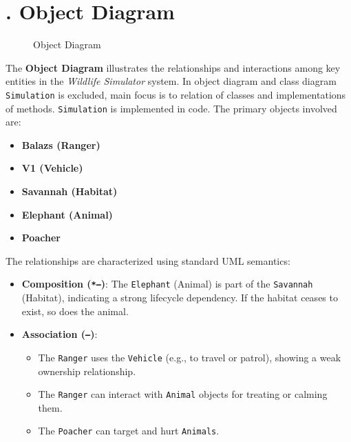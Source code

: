 \documentclass[a4paper,12pt]{article}
\begin{document}
\newpage


\section*{. Object Diagram}

\begin{figure}[H]
    \centering
    \caption{Object Diagram}
    \label{fig:object-diagram}
\end{figure}

\vspace{0.5em}

\noindent
The \textbf{Object Diagram} illustrates the relationships and interactions among key entities in the \emph{Wildlife Simulator} system. In object diagram and class diagram \texttt{Simulation} is excluded, main focus is to relation of classes and implementations of methods. \texttt{Simulation} is implemented in code. The primary objects involved are:

\begin{itemize}
    \item \textbf{Balazs (Ranger)}
    \item \textbf{V1 (Vehicle)}
    \item \textbf{Savannah (Habitat)}
    \item \textbf{Elephant (Animal)}
    \item \textbf{Poacher}
\end{itemize}

\vspace{0.5em}

\noindent
The relationships are characterized using standard UML semantics:
\begin{itemize}
    \item \textbf{Composition (\texttt{*--})}: The \texttt{Elephant} (Animal) is part of the \texttt{Savannah} (Habitat), indicating a strong lifecycle dependency. If the habitat ceases to exist, so does the animal.
    
    \item \textbf{Association (\texttt{--})}: 
    \begin{itemize}
        \item The \texttt{Ranger} uses the \texttt{Vehicle} (e.g., to travel or patrol), showing a weak ownership relationship.
        \item The \texttt{Ranger} can interact with \texttt{Animal} objects for treating or calming them.
        \item The \texttt{Poacher} can target and hurt \texttt{Animals}.
    \end{itemize}
\end{itemize}
\end{document}
